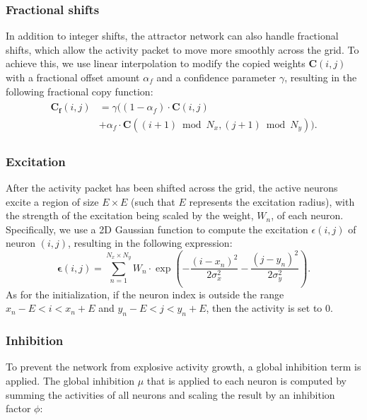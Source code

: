 \subsubsection{\textbf{Fractional shifts}}
In addition to integer shifts, the attractor network can also handle fractional shifts, which allow the activity packet to move more smoothly across the grid. To achieve this, we use linear interpolation to modify the copied weights $\mathbf{C}(i,j)$ with a fractional offset amount $\alpha_f$ and a confidence parameter $\gamma$, resulting in the following fractional copy function:
\begin{align}
\begin{split}
      \mathbf{C_f}(i,j) &= \gamma\big((1 - \alpha_f)\cdot \mathbf{C}(i,j) \\&+ \alpha_f \cdot \mathbf{C}((i+1) \bmod N_x,(j+1)\bmod N_y)\big).
\end{split}
\end{align}



\subsubsection{\textbf{Excitation}}
After the activity packet has been shifted across the grid, the active neurons excite a region of size $E\times E$ (such that $E$ represents the excitation radius), with the strength of the excitation being scaled by the weight, $W_n$, of each neuron. Specifically, we use a 2D Gaussian function to compute the excitation $\epsilon(i,j)$ of neuron $(i,j)$, resulting in the following expression:
\begin{equation}
\boldsymbol\epsilon(i,j)=\sum_{n=1}^{N_x \times N_y}  W_n\cdot\exp\left(-\frac{(i-x_n)^2}{2\sigma_x^2} - \frac{(j-y_n)^2}{2\sigma_y^2}\right).
\end{equation}
As for the initialization, if the neuron index is outside the range $x_n-E < i < x_n+E$ and $y_n-E < j < y_n+E$, then the activity is set to 0.





\subsubsection{\textbf{Inhibition}}
To prevent the network from explosive activity growth, a global inhibition term is applied. The global inhibition $\mu$ that is applied to each neuron is computed by summing the activities of all neurons and scaling the result by an inhibition factor $\phi$:

